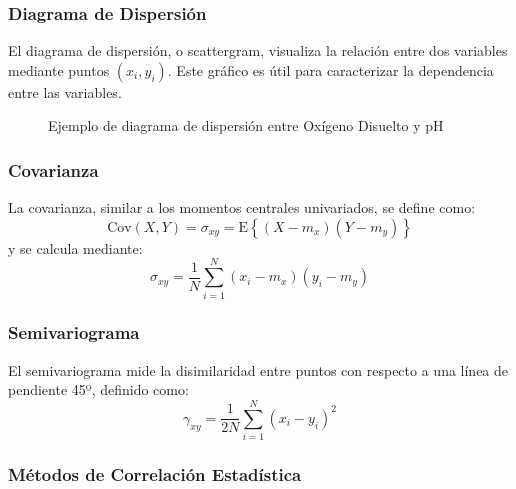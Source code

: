 \subsubsection{Diagrama de Dispersión}

El diagrama de dispersión, o scattergram, visualiza la relación entre dos variables mediante puntos \((x_i, y_i)\). Este gráfico es útil para caracterizar la dependencia entre las variables.

\begin{figure}[h]
\centering
{}
\caption{Ejemplo de diagrama de dispersión entre Oxígeno Disuelto y pH}
\label{fig:distribucionNormal}
\end{figure}

\subsubsection{Covarianza}

La covarianza, similar a los momentos centrales univariados, se define como:
\[
\text{Cov}(X, Y) = \sigma_{xy} = \mathrm{E}\left\{ (X - m_x)(Y - m_y) \right\}
\]
y se calcula mediante:
\[
\sigma_{xy} = \frac{1}{N} \sum_{i=1}^{N} (x_i - m_x)(y_i - m_y)
\]

\subsubsection{Semivariograma}

El semivariograma mide la disimilaridad entre puntos con respecto a una línea de pendiente 45º, definido como:
\[
\gamma_{xy} = \frac{1}{2N} \sum_{i=1}^{N} \left( x_i - y_i \right)^2
\]

\subsubsection{Métodos de Correlación Estadística}

